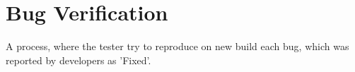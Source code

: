 \section{Bug Verification}
\label{sec:Bug Verification}

A process, where the tester try to reproduce on new build each bug, which was reported by developers as 'Fixed'.
